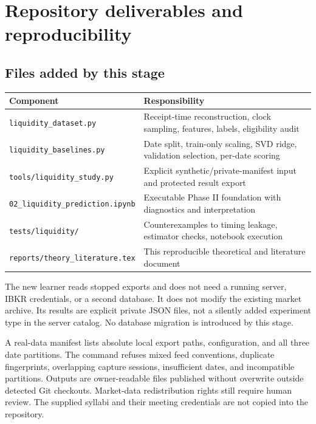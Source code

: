 \section{Repository deliverables and reproducibility}
\subsection{Files added by this stage}
\par\medskip
\begin{tabularx}{\textwidth}{@{}p{63mm}Y@{}}\toprule
Component & Responsibility\\\midrule
\texttt{liquidity\_dataset.py} & Receipt-time reconstruction, clock sampling, features, labels, eligibility audit\\
\texttt{liquidity\_baselines.py} & Date split, train-only scaling, SVD ridge, validation selection, per-date scoring\\
\texttt{tools/liquidity\_study.py} & Explicit synthetic/private-manifest input and protected result export\\
\texttt{02\_liquidity\_prediction.ipynb} & Executable Phase II foundation with diagnostics and interpretation\\
\texttt{tests/liquidity/} & Counterexamples to timing leakage, estimator checks, notebook execution\\
\texttt{reports/theory\_literature.tex} & This reproducible theoretical and literature document\\\bottomrule
\end{tabularx}
\par\medskip
The new learner reads stopped exports and does not need a running server, IBKR credentials, or a second database. It does not modify the existing market archive. Its results are explicit private JSON files, not a silently added experiment type in the server catalog. No database migration is introduced by this stage.

A real-data manifest lists absolute local export paths, configuration, and all three date partitions. The command refuses mixed feed conventions, duplicate fingerprints, overlapping capture sessions, insufficient dates, and incompatible partitions. Outputs are owner-readable files published without overwrite outside detected Git checkouts. Market-data redistribution rights still require human review. The supplied syllabi and their meeting credentials are not copied into the repository.

